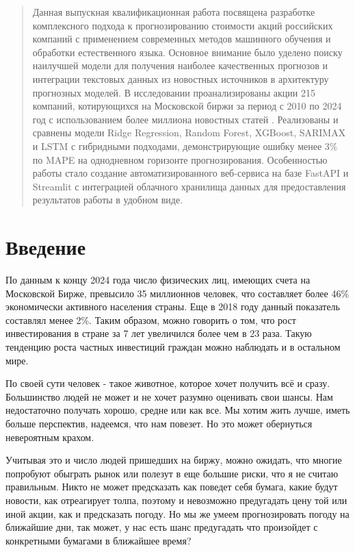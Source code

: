 \documentclass[12pt, a4paper]{article}
\begin{document}
\newpage
\begin{abstract}
Данная выпускная квалификационная работа посвящена разработке комплексного подхода к прогнозированию стоимости акций российских компаний с применением современных методов машинного обучения и обработки естественного языка. Основное внимание было уделено поиску наилучшей модели для получения наиболее качественных прогнозов и интеграции текстовых данных из новостных источников в архитектуру прогнозных моделей. В исследовании проанализированы акции 215 компаний, котирующихся на Московской биржи за период с 2010 по 2024 год с использованием более миллиона новостных статей . Реализованы и сравнены модели Ridge Regression, Random Forest, XGBoost, SARIMAX и LSTM с гибридными подходами, демонстрирующие ошибку менее 3\% по MAPE на однодневном горизонте прогнозирования. Особенностью работы стало создание автоматизированного веб-сервиса на базе FastAPI и Streamlit с интеграцией облачного хранилища данных для предоставления результатов работы в удобном виде.
\end{abstract}

\newpage
\section{Введение}
По данным  \cite{interfax} к концу 2024 года число физических лиц, имеющих счета на Московской Бирже, превысило 35 миллионнов человек, что составляет более 46\% экономически активного населения страны. Еще в 2018 году данный показатель составлял менее 2\%. Таким образом, можно говорить о том, что рост инвестирования в стране за 7 лет увеличился более чем в 23 раза. Такую тенденцию роста частных инвестиций граждан можно наблюдать и в остальном мире.

По своей сути человек - такое животное, которое хочет получить всё и сразу. Большинство людей не может и не хочет разумно оценивать свои шансы. Нам недостаточно получать хорошо, средне или как все. Мы хотим жить лучше, иметь больше перспектив, надеемся, что нам повезет. Но это может обернуться невероятным крахом.

Учитывая это и число людей пришедших на биржу, можно ожидать, что многие попробуют обыграть рынок или полезут в еще большие риски, что я не считаю правильным. Никто не может предсказать как поведет себя бумага, какие будут новости, как отреагирует толпа, поэтому и невозможно предугадать цену той или иной акции, как и предсказать погоду. Но мы же умеем прогнозировать погоду на ближайшие дни, так может, у нас есть шанс предугадать что произойдет с конкретными бумагами в ближайшее время?
\end{document}
